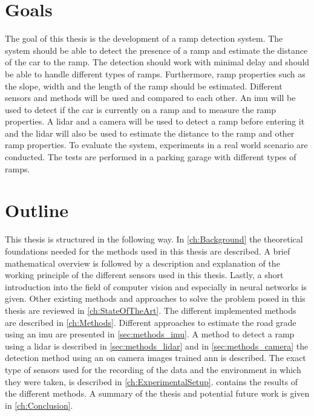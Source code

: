 \section{Goals}
The goal of this thesis is the development of a ramp detection system.
The system should be able to detect the presence of a ramp and estimate the distance of the car to the ramp.
The detection should work with minimal delay and should be able to handle different types of ramps.
Furthermore, ramp properties such as the slope, width and the length of the ramp should be estimated.
Different sensors and methods will be used and compared to each other.
An \gls{imu} will be used to detect if the car is currently on a ramp and to measure the ramp properties.
A \gls{lidar} and a camera will be used to detect a ramp before entering it and the \gls{lidar} will also be used to estimate the distance to the ramp and other ramp properties.
To evaluate the system, experiments in a real world scenario are conducted.
The tests are performed in a parking garage with different types of ramps.



\section{Outline}
This thesis is structured in the following way.
In \cref{ch:Background} the theoretical foundations needed for the methods used in this thesis are described.
A brief mathematical overview is followed by a description and explanation of the working principle of the different sensors used in this thesis.
Lastly, a short introduction into the field of computer vision and especially in neural networks is given.
Other existing methods and approaches to solve the problem posed in this thesis are reviewed in \cref{ch:StateOfTheArt}.
The different implemented methods are described in \cref{ch:Methods}.
Different approaches to estimate the road grade using an \gls{imu} are presented in \cref{sec:methods_imu}.
A method to detect a ramp using a \gls{lidar} is described in \cref{sec:methods_lidar} and in \cref{sec:methods_camera} the detection method using an on camera images trained \gls{ann} is described.
The exact type of sensors used for the recording of the data and the environment in which they were taken, is described in \cref{ch:ExperimentalSetup}.
 contains the results of the different methods.
A summary of the thesis and potential future work is given in \cref{ch:Conclusion}.
